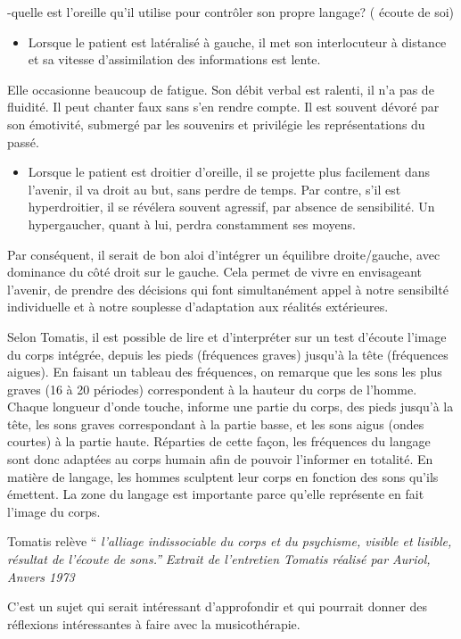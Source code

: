 \documentclass[12pt,french]{report}
\makeatletter
\let\SF@@footnote\footnote
\def\footnote{\ifx\protect\@typeset@protect
    \expandafter\SF@@footnote
  \else
    \expandafter\SF@gobble@opt
  \fi
}
\edef\SF@gobble@opt{\noexpand\protect
  \expandafter\noexpand\csname SF@gobble@opt \endcsname}
\makeatother
\begin{document}
-quelle est l'oreille qu'il utilise pour contrôler son propre langage?
( écoute de soi)
\begin{itemize}
\item Lorsque le patient est latéralisé à gauche, il met son interlocuteur
à distance et sa vitesse d'assimilation des informations est lente.
\end{itemize}
Elle occasionne beaucoup de fatigue. Son débit verbal est ralenti,
il n'a pas de fluidité. Il peut chanter faux sans s'en rendre compte.
Il est souvent dévoré par son émotivité, submergé par les souvenirs
et privilégie les représentations du passé.
\begin{itemize}
\item Lorsque le patient est droitier d'oreille, il se projette plus facilement
dans l'avenir, il va droit au but, sans perdre de temps. Par contre,
s'il est hyperdroitier, il se révélera souvent agressif, par absence
de sensibilité. Un hypergaucher, quant à lui, perdra constamment ses
moyens.
\end{itemize}
Par conséquent, il serait de bon aloi d'intégrer un équilibre droite/gauche,
avec dominance du côté droit sur le gauche. Cela permet de vivre en
envisageant l'avenir, de prendre des décisions qui font simultanément
appel à notre sensibilté individuelle et à notre souplesse d'adaptation
aux réalités extérieures.

Selon Tomatis, il est possible de lire et d'interpréter sur un test
d'écoute l'image du corps intégrée, depuis les pieds (fréquences graves)
jusqu'à la tête (fréquences aigues). En faisant un tableau des fréquences,
on remarque que les sons les plus graves (16 à 20 périodes) correspondent
à la hauteur du corps de l'homme. Chaque longueur d'onde touche, informe
une partie du corps, des pieds jusqu'à la tête, les sons graves correspondant
à la partie basse, et les sons aigus (ondes courtes) à la partie haute.
Réparties de cette façon, les fréquences du langage sont donc adaptées
au corps humain afin de pouvoir l'informer en totalité. En matière
de langage, les hommes sculptent leur corps en fonction des sons qu'ils
émettent. La zone du langage est importante parce qu'elle représente
en fait l'image du corps.

Tomatis relève ``\emph{ l'alliage indissociable du corps et du psychisme,
visible et lisible, résultat de l'écoute de sons.''}\footnote{\emph{Extrait de l'entretien Tomatis réalisé par Auriol, Anvers 1973}}

C'est un sujet qui serait intéressant d'approfondir et qui pourrait
donner des réflexions intéressantes à faire avec la musicothérapie.
\end{document}
